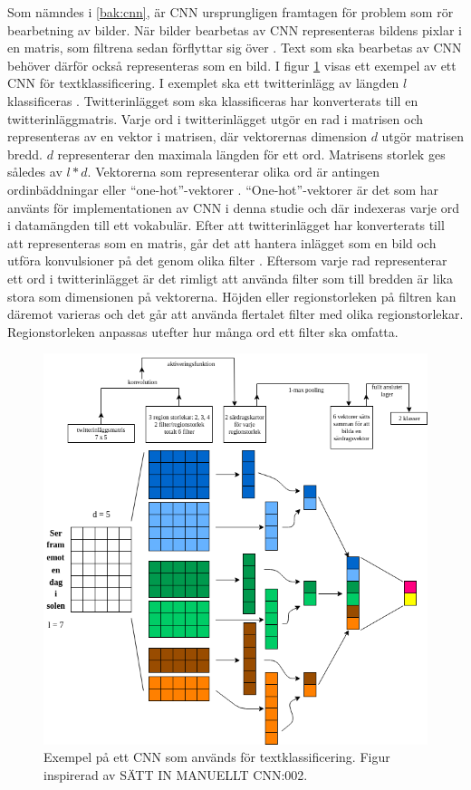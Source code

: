 \documentclass{kaumasters} %
\begin{document}
Som nämndes i \ref{bak:cnn}, är CNN ursprungligen framtagen för problem som rör bearbetning av bilder. När bilder bearbetas av CNN representeras bildens pixlar i en matris, som filtrena sedan förflyttar sig över \cite{cnn:004}. Text som ska bearbetas av CNN behöver därför också representeras som en bild. I figur \ref{fig:cnntext} visas ett exempel av ett CNN för textklassificering. I exemplet ska ett twitterinlägg av längden $l$ klassificeras \cite{cnn:002}. Twitterinlägget som ska klassificeras har konverterats till en twitterinläggmatris. Varje ord i twitterinlägget utgör en rad i matrisen och representeras av en vektor i matrisen, där vektorernas dimension $d$ utgör matrisen bredd. $d$ representerar den maximala längden för ett ord.  Matrisens storlek ges således av $l*d$. Vektorerna som representerar olika ord är antingen ordinbäddningar \cite{wiki:016} eller “one-hot”-vektorer \cite{cnn:004}. “One-hot”-vektorer är det som har använts för implementationen av CNN i denna studie och där indexeras varje ord i datamängden till ett vokabulär. Efter att twitterinlägget har konverterats till att representeras som en matris, går det att hantera inlägget som en bild och utföra konvulsioner på det genom olika filter \cite{cnn:002}. Eftersom varje rad representerar ett ord i twitterinlägget är det rimligt att använda filter som till bredden är lika stora som dimensionen på vektorerna. Höjden eller regionstorleken på filtren kan däremot varieras och det går att använda flertalet filter med olika regionstorlekar. Regionstorleken anpassas utefter hur många ord ett filter ska omfatta. 

\begin{figure}[H]
\includegraphics[width=12cm]{cnn_text}
\centering
\caption{Exempel på ett CNN som används för textklassificering. Figur inspirerad av SÄTT IN MANUELLT CNN:002.}
\label{fig:cnntext}
\end{figure}
\end{document}
